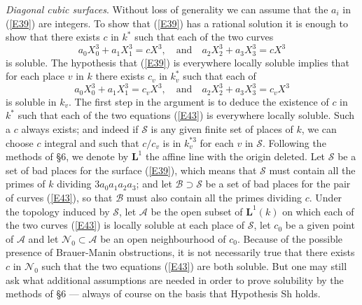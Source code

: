 \documentclass[12pt]{article}
\def\bL{{\mathbf L}}
\def\sA{{\mathcal A}}
\def\sB{{\mathcal B}}
\def\sN{{\mathcal N}}
\def\sS{{\mathcal S}}
\def\Sha{\mbox{\wncyr Sh}}
\def\beq{\begin{equation} \label}
\begin{document}
 \emph{Diagonal cubic surfaces}. \newline
Without loss of generality we can assume that the $a_i$ in
(\ref{E39}) are integers. To show that (\ref{E39}) has a
rational solution it is enough to show that
there exists $c$ in $k^*$ such that each of the two curves
\beq{E43} a_0X_0^3+a_1X_1^3=cX^3, \quad {\mathrm{and}}
\quad a_2X_2^3+a_3X_3^3=cX^3 \end{equation}
is soluble. The hypothesis that (\ref{E39}) is everywhere locally soluble
implies that for each place $v$ in $k$ there exists $c_v$ in $k^*_v$ such that
each of
\[ a_0X_0^3+a_1X_1^3=c_vX^3, \quad {\mathrm{and}}
\quad a_2X_2^3+a_3X_3^3=c_vX^3 \]
is soluble in $k_v$. The first step in the argument is to 
deduce the existence of $c$ in $k^*$ such that each of the two equations
(\ref{E43}) is everywhere locally soluble. Such a $c$ always exists; and indeed
if $\sS$ is any given finite set of places of $k$, we can choose $c$ integral
and such that $c/c_v$ is in $k^{*3}_v$ for each $v$ in $\sS$. Following the
methods of \S6, we denote by $\bL^1$ the affine line with the origin deleted.
Let $\sS$ be a set of bad places for the surface (\ref{E39}), which means that
$\sS$ must contain all the primes of $k$ dividing $3a_0a_1a_2a_3$; and let
$\sB\supset\sS$ be a set of bad places for the pair of curves (\ref{E43}), so
that $\sB$ must also contain all the primes dividing $c$. Under the topology
induced by $\sS$, let $\sA$ be the open subset of $\bL^1(k)$ on which each of
the two curves (\ref{E43}) is locally soluble at each place of $\sS$, let $c_0$
be a given point of $\sA$ and let $\sN_0\subset\sA$ be an open neighbourhood of
$c_0$. Because of the possible presence of Brauer-Manin obstructions, it is not
necessarily true that there exists $c$ in $\sN_0$ such that the two equations
(\ref{E43}) are both soluble. But one may still ask what additional assumptions
are needed in order to prove solubility by the methods of \S6 --- always of
course on the basis that Hypothesis {\Sha} holds.
\end{document}
